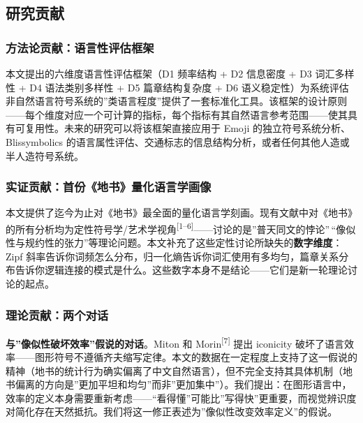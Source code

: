 \documentclass[12pt,a4paper,UTF8,fontset=founder]{ctexart}
\begin{document}
\subsection{研究贡献}\label{ux7814ux7a76ux8d21ux732e}

\subsubsection{方法论贡献：语言性评估框架}\label{ux65b9ux6cd5ux8bbaux8d21ux732eux8bedux8a00ux6027ux8bc4ux4f30ux6846ux67b6}

本文提出的六维度语言性评估框架（D1 频率结构 + D2 信息密度 + D3 词汇多样性 + D4 语法类别多样性 + D5 篇章结构复杂度 + D6 语义稳定性）为系统评估非自然语言符号系统的''类语言程度''提供了一套标准化工具。该框架的设计原则------每个维度对应一个可计算的指标，每个指标有其自然语言参考范围------使其具有可复用性。未来的研究可以将该框架直接应用于 Emoji 的独立符号系统分析、Blissymbolics 的语言属性评估、交通标志的信息结构分析，或者任何其他人造或半人造符号系统。

\subsubsection{实证贡献：首份《地书》量化语言学画像}\label{ux5b9eux8bc1ux8d21ux732eux9996ux4efdux5730ux4e66ux91cfux5316ux8bedux8a00ux5b66ux753bux50cf}

本文提供了迄今为止对《地书》最全面的量化语言学刻画。现有文献中对《地书》的所有分析均为定性符号学/艺术学视角\textsuperscript{{[}1--6{]}}------讨论的是''普天同文的悖论''\,``像似性与规约性的张力''等理论问题。本文补充了这些定性讨论所缺失的\textbf{数字维度}：Zipf 斜率告诉你词频怎么分布，归一化熵告诉你词汇使用有多均匀，篇章关系分布告诉你逻辑连接的模式是什么。这些数字本身不是结论------它们是新一轮理论讨论的起点。

\subsubsection{理论贡献：两个对话}\label{ux7406ux8bbaux8d21ux732eux4e24ux4e2aux5bf9ux8bdd}

\textbf{与''像似性破坏效率''假说的对话}。Miton 和 Morin\textsuperscript{{[}7{]}} 提出 iconicity 破坏了语言效率------图形符号不遵循齐夫缩写定律。本文的数据在一定程度上支持了这一假说的精神（地书的统计行为确实偏离了中文自然语言），但不完全支持其具体机制（地书偏离的方向是''更加平坦和均匀''而非''更加集中''）。我们提出：在图形语言中，效率的定义本身需要重新考虑------``看得懂''可能比''写得快''更重要，而视觉辨识度对简化存在天然抵抗。我们将这一修正表述为''像似性改变效率定义''的假说。
\end{document}
